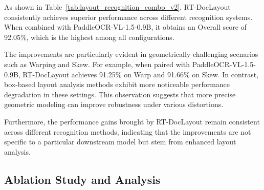 \documentclass[11pt, a4paper,logo,  copyright, nonumbering]{paddleocr}
\begin{document}
As shown in Table~\ref{tab:layout_recognition_combo_v2}, RT-DocLayout consistently achieves superior performance across different recognition systems. When combined with PaddleOCR-VL-1.5-0.9B, it obtains an Overall score of 92.05\%, which is the highest among all configurations.

The improvements are particularly evident in geometrically challenging scenarios such as Warping and Skew. For example, when paired with PaddleOCR-VL-1.5-0.9B, RT-DocLayout achieves 91.25\% on Warp and 91.66\% on Skew. In contrast, box-based layout analysis methods exhibit more noticeable performance degradation in these settings. This observation suggests that more precise geometric modeling can improve robustness under various distortions.

Furthermore, the performance gains brought by RT-DocLayout remain consistent across different recognition methods, indicating that the improvements are not specific to a particular downstream model but stem from enhanced layout analysis.



\subsection{Ablation Study and Analysis}
\label{subsec:ablation_study_and_analysis}
\end{document}
